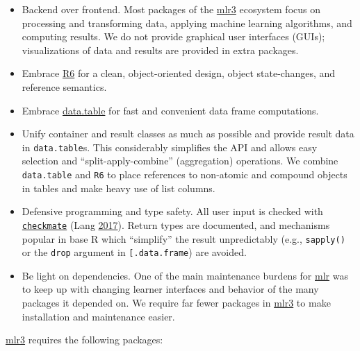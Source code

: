 \documentclass[]{article}
\providecommand{\tightlist}{%
  \setlength{\itemsep}{0pt}\setlength{\parskip}{0pt}}
\begin{document}
\begin{itemize}
\tightlist
\item
  Backend over frontend.
  Most packages of the \href{https://mlr3.mlr-org.com}{mlr3} ecosystem focus on processing and transforming data, applying machine learning algorithms, and computing results.
  We do not provide graphical user interfaces (GUIs); visualizations of data and results are provided in extra packages.
\item
  Embrace \href{https://cran.r-project.org/package=R6}{R6} for a clean, object-oriented design, object state-changes, and reference semantics.
\item
  Embrace \href{https://cran.r-project.org/package=data.table}{data.table} for fast and convenient data frame computations.
\item
  Unify container and result classes as much as possible and provide result data in \texttt{data.table}s.
  This considerably simplifies the API and allows easy selection and ``split-apply-combine'' (aggregation) operations.
  We combine \texttt{data.table} and \texttt{R6} to place references to non-atomic and compound objects in tables and make heavy use of list columns.
\item
  Defensive programming and type safety.
  All user input is checked with \href{https://cran.r-project.org/package=checkmate}{\texttt{checkmate}} (Lang \protect\hyperlink{ref-checkmate}{2017}).
  Return types are documented, and mechanisms popular in base R which ``simplify'' the result unpredictably (e.g., \texttt{sapply()} or the \texttt{drop} argument in \texttt{{[}.data.frame}) are avoided.
\item
  Be light on dependencies.
  One of the main maintenance burdens for \href{https://mlr.mlr-org.com}{mlr} was to keep up with changing learner interfaces and behavior of the many packages it depended on.
  We require far fewer packages in \href{https://mlr3.mlr-org.com}{mlr3} to make installation and maintenance easier.
\end{itemize}

\href{https://mlr3.mlr-org.com}{mlr3} requires the following packages:
\end{document}
